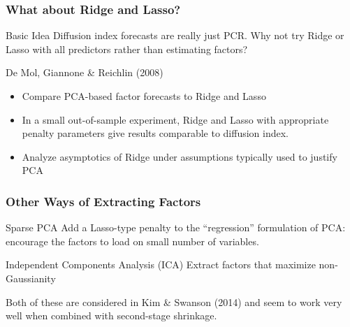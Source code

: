 \documentclass[handout]{beamer}
\begin{document}

\begin{frame}[c]\frametitle{What about Ridge and Lasso?}
    
 \begin{block}
 	{Basic Idea}
 	Diffusion index forecasts are really just PCR. Why not try Ridge or Lasso with all predictors rather than estimating factors?
 \end{block}

 \begin{block}
 	{De Mol, Giannone \& Reichlin (2008)}
 	\begin{itemize}
 		\item Compare PCA-based factor forecasts to Ridge and Lasso
 		\item In a small out-of-sample experiment, Ridge and Lasso with appropriate penalty parameters give results comparable to diffusion index.
 		\item Analyze asymptotics of Ridge under assumptions typically used to justify PCA
 	\end{itemize}
 
 \end{block}



\end{frame}
\begin{frame}[c]\frametitle{Other Ways of Extracting Factors}
    
    \begin{block}
    	{Sparse PCA}
    	Add a Lasso-type penalty to the ``regression'' formulation of PCA: encourage the factors to load on small number of variables.
    \end{block}

    \begin{block}
    	{Independent Components Analysis (ICA)}
    	Extract factors that maximize non-Gaussianity
    \end{block}

\vspace{1em}

\alert{Both of these are considered in Kim \& Swanson (2014) and seem to work very well when combined with second-stage shrinkage.}


\end{frame}
\end{document}
